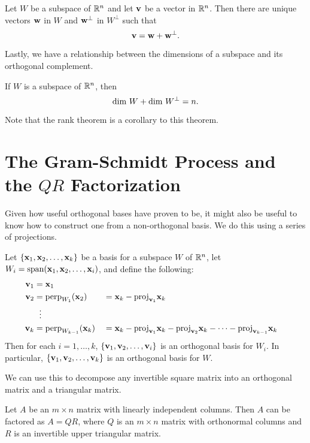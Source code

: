 \documentclass[../m073main.tex]{subfiles}
\begin{document}
\begin{theorem}
	Let $W$ be a subspace of $\mathbb{R}^n$ and let $\mathbf{v}$ be a vector in $\mathbb{R}^n$.
	Then there are unique vectors $\mathbf{w}$ in $W$ and $\mathbf{w}^\perp$ in $W^\perp$ such that
	\[ \mathbf{v} = \mathbf{w} + \mathbf{w}^\perp. \]
\end{theorem}

Lastly, we have a relationship between the dimensions of a subspace and its orthogonal complement.

\begin{theorem}
	If $W$ is a subspace of $\mathbb{R}^n$, then
	\[ \textrm{dim } W + \textrm{dim } W^\perp = n. \]
\end{theorem}

Note that the rank theorem is a corollary to this theorem.

\section{The Gram-Schmidt Process and the $QR$ Factorization}
Given how useful orthogonal bases have proven to be, it might also be useful to know how to construct one from a non-orthogonal basis.
We do this using a series of projections.

\begin{theorem}
	Let $\{\mathbf{x}_1, \mathbf{x}_2, \ldots, \mathbf{x}_k\}$ be a basis for a subspace $W$ of $\mathbb{R}^n$, let $W_i = \textrm{span}(\mathbf{x}_1, \mathbf{x}_2, \ldots, \mathbf{x}_i)$, and define the following:
	\begin{alignat*}{2}
		\mathbf{v}_1 &= \mathbf{x}_1 \\
		\mathbf{v}_2 &= \textrm{perp}_{W_1}(\mathbf{x}_2) &&= \mathbf{x}_k - \textrm{proj}_{\mathbf{v}_1}\mathbf{x}_k \\
		&\phantom{~!}\vdots \\
		\mathbf{v}_k &= \textrm{perp}_{W_{k-1}}(\mathbf{x}_k) &&= \mathbf{x}_k - \textrm{proj}_{\mathbf{v}_1}\mathbf{x}_k - \textrm{proj}_{\mathbf{v}_2}\mathbf{x}_k - \cdots - \textrm{proj}_{\mathbf{v}_{k-1}}\mathbf{x}_k
	\end{alignat*}
	Then for each $i = 1, \ldots, k$, $\{\mathbf{v}_1, \mathbf{v}_2, \ldots, \mathbf{v}_i\}$ is an orthogonal basis for $W_i$.
	In particular, $\{\mathbf{v}_1, \mathbf{v}_2, \ldots, \mathbf{v}_k\}$ is an orthogonal basis for $W$.
\end{theorem}

We can use this to decompose any invertible square matrix into an orthogonal matrix and a triangular matrix.

\begin{theorem}[$QR$ factorization]
	Let $A$ be an $m \times n$ matrix with linearly independent columns.
	Then $A$ can be factored as $A = QR$, where $Q$ is an $m \times n$ matrix with orthonormal columns and $R$ is an invertible upper triangular matrix.
\end{theorem}
\end{document}
